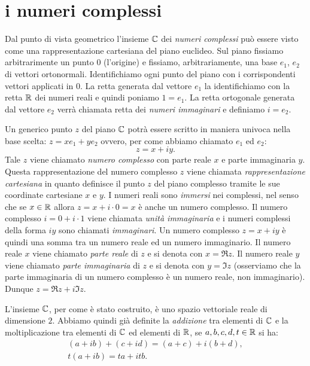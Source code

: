 \section{i numeri complessi}
%
%
%
\label{sec:complessi}

Dal punto di vista geometrico l'insieme $\CC$ dei \emph{numeri complessi}%
%
\index{$\CC$}
può essere visto come una rappresentazione cartesiana 
del piano euclideo.
Sul piano fissiamo arbitrarimente un punto $0$ (l'origine) 
e fissiamo, arbitrariamente, una base $e_1$, $e_2$ di vettori ortonormali.
Identifichiamo ogni punto del piano con i corrispondenti vettori
applicati in $0$. La retta generata dal vettore $e_1$ la identifichiamo
con la retta ${\mathbb R}$ dei numeri reali e quindi poniamo $1=e_1$.
La retta ortogonale generata dal vettore $e_2$ verrà chiamata
retta dei \emph{numeri immaginari} e definiamo $i=e_2$.

Un generico punto $z$ del piano $\CC$ potrà essere scritto in
maniera univoca nella base scelta: $z = x e_1 + y e_2$ ovvero,
per come abbiamo chiamato $e_1$ ed $e_2$:
\[
z = x + i y.
\]
Tale $z$ viene chiamato
\emph{numero complesso} con parte reale $x$ e parte immaginaria $y$.
Questa rappresentazione del numero complesso $z$ viene
chiamata \emph{rappresentazione cartesiana}%
%
 in quanto definisce
il punto $z$ del piano complesso tramite le sue coordinate cartesiane
$x$ e $y$.
I numeri reali sono \emph{immersi} nei complessi, nel senso che se
$x\in {\mathbb R}$ allora $z= x + i\cdot 0 = x$ è anche un numero complesso.
Il numero complesso $i = 0 + i\cdot 1$ viene chiamata \emph{unità immaginaria}%
%
e i numeri complessi della forma $iy$ sono chiamati \emph{immaginari}.
Un numero
complesso $z = x+iy$ è quindi una somma tra un numero reale ed un numero
immaginario. Il numero reale $x$ viene chiamato \emph{parte reale}
di $z$ e
si denota con $x=\Re z$.
%
Il numero reale $y$ viene chiamato
\emph{parte immaginaria}
di $z$ e si denota con $y=\Im z$
%
(osserviamo che la parte immaginaria di un numero complesso è un numero
reale, non immaginario). Dunque $z= \Re z + i \Im z$.

L'insieme $\CC$, per come
è stato costruito, è uno spazio vettoriale reale di dimensione $2$.
Abbiamo quindi già definite la \emph{addizione}%
%
tra elementi di $\CC$ e la moltiplicazione
tra elementi di $\CC$ ed elementi di ${\mathbb R}$,
se $a,b,c,d,t\in {\mathbb R}$ si ha:
\begin{gather*}
 (a+ib) + (c+id) = (a+c) + i (b+d), \\
 t(a+ib) = ta + itb.
\end{gather*}

